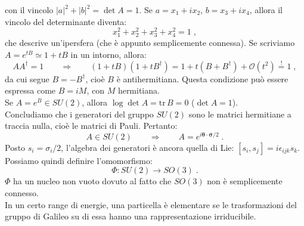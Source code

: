 \documentclass[12pt,a4paper]{report}
\theoremstyle{definition}
\numberwithin{equation}{section}
\newcommand{\adj}[1]{#1^{\dagger}}
\newcommand{\tr}{\mathrm{tr}}
\begin{document}
con il vincolo $|a|^2+|b|^2=\det A=1$. Se $a=x_1+ix_2$, $b=x_3+ix_4$, allora il vincolo del determinante diventa:
\begin{equation}
x_1^2+x_2^2+x_3^2+x_4^2=1\;,
\end{equation}
che descrive un'ipersfera (che è appunto semplicemente connessa). Se scriviamo $A=e^{tB}\simeq 1+tB$ in un intorno, allora:
\begin{equation}
A\adj{A}=1\qquad \Longrightarrow \qquad (1+tB)(1+t\adj{B})=1+t(B+\adj{B})+\mathcal{O}(t^2)\stackrel{!}{=} 1\;,
\end{equation}
da cui segue $B=-\adj{B}$, cioè $B$ è antihermitiana. Questa condizione può essere espressa come $B=iM$, con $M$ hermitiana. \\
Se $A=e^B\in SU(2)$, allora $\log\det A=\tr\, B=0$ ($\det A=1$). \\
Concludiamo che i generatori del gruppo $SU(2)$ sono le matrici hermitiane a traccia nulla, cioè le matrici di Pauli. Pertanto:
\begin{equation}
A\in SU(2) \qquad \Longrightarrow \qquad A=e^{i\boldsymbol{\theta}\cdot \boldsymbol{\sigma}/2}\;.
\end{equation}
Posto $s_i=\sigma_i/2$, l'algebra dei generatori è ancora quella di Lie: $[s_i,s_j]=i\epsilon_{ijk}s_k$. Possiamo quindi definire l'omomorfismo:
\begin{equation}
\Phi: SU(2) \longrightarrow SO(3)\;.
\end{equation}
$\Phi$ ha un nucleo non vuoto dovuto al fatto che $SO(3)$ non è semplicemente connesso. \\
In un certo range di energie, una particella è elementare se le trasformazioni del gruppo di Galileo su di essa hanno una rappresentazione irriducibile. \\
\end{document}

